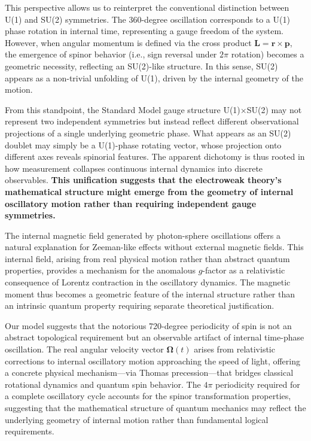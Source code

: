 \documentclass[%
 reprint,
 amsmath,amssymb,
 aps,
]{revtex4-1}
\numberwithin{equation}{section}%
\begin{document}
This perspective allows us to reinterpret the conventional distinction between U(1) and SU(2) symmetries. The 360-degree oscillation corresponds to a U(1) phase rotation in internal time, representing a gauge freedom of the system. However, when angular momentum is defined via the cross product $\boldsymbol{L} = \boldsymbol{r} \times \boldsymbol{p}$, the emergence of spinor behavior (i.e., sign reversal under $2\pi$ rotation) becomes a geometric necessity, reflecting an SU(2)-like structure. In this sense, SU(2) appears as a non-trivial unfolding of U(1), driven by the internal geometry of the motion.

From this standpoint, the Standard Model gauge structure U(1)$\times$SU(2) may not represent two independent symmetries but instead reflect different observational projections of a single underlying geometric phase. What appears as an SU(2) doublet may simply be a U(1)-phase rotating vector, whose projection onto different axes reveals spinorial features. The apparent dichotomy is thus rooted in how measurement collapses continuous internal dynamics into discrete observables. \textbf{This unification suggests that the electroweak theory's mathematical structure might emerge from the geometry of internal oscillatory motion rather than requiring independent gauge symmetries.}

The internal magnetic field generated by photon-sphere oscillations offers a natural explanation for Zeeman-like effects without external magnetic fields. This internal field, arising from real physical motion rather than abstract quantum properties, provides a mechanism for the anomalous $g$-factor as a relativistic consequence of Lorentz contraction in the oscillatory dynamics. The magnetic moment thus becomes a geometric feature of the internal structure rather than an intrinsic quantum property requiring separate theoretical justification.

Our model suggests that the notorious 720-degree periodicity of spin is not an abstract topological requirement but an observable artifact of internal time-phase oscillation. The real angular velocity vector $\boldsymbol{\Omega}(t)$ arises from relativistic corrections to internal oscillatory motion approaching the speed of light, offering a concrete physical mechanism—via Thomas precession—that bridges classical rotational dynamics and quantum spin behavior. The $4\pi$ periodicity required for a complete oscillatory cycle accounts for the spinor transformation properties, suggesting that the mathematical structure of quantum mechanics may reflect the underlying geometry of internal motion rather than fundamental logical requirements.
\end{document}
